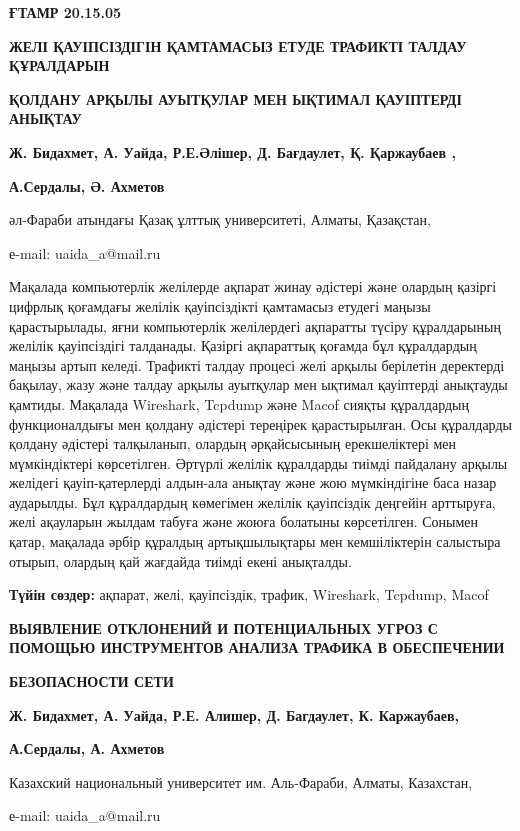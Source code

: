 \textbf{ҒТАМР 20.15.05}

\textbf{ЖЕЛІ ҚАУІПСІЗДІГІН ҚАМТАМАСЫЗ ЕТУДЕ ТРАФИКТІ ТАЛДАУ ҚҰРАЛДАРЫН}

\textbf{ҚОЛДАНУ АРҚЫЛЫ АУЫТҚУЛАР МЕН ЫҚТИМАЛ ҚАУІПТЕРДІ АНЫҚТАУ}

\textbf{Ж. Бидахмет, А. Уайда, Р.Е.Әлішер, Д. Бағдаулет, Қ. Қаржаубаев
,}

\textbf{А.Сердалы, Ә. Ахметов}

әл-Фараби атындағы Қазақ ұлттық университеті, Алматы, Қазақстан,

е-mail: uaida\_a@mail.ru

Мақалада компьютерлік желілерде ақпарат жинау әдістері және олардың
қазіргі цифрлық қоғамдағы желілік қауіпсіздікті қамтамасыз етудегі
маңызы қарастырылады, яғни компьютерлік желілердегі ақпаратты түсіру
құралдарының желілік қауіпсіздігі талданады. Қазіргі ақпараттық қоғамда
бұл құралдардың маңызы артып келеді. Трафикті талдау процесі желі арқылы
берілетін деректерді бақылау, жазу және талдау арқылы ауытқулар мен
ықтимал қауіптерді анықтауды қамтиды. Мақалада Wireshark, Tcpdump және
Macof сияқты құралдардың функционалдығы мен қолдану әдістері тереңірек
қарастырылған. Осы құралдарды қолдану әдістері талқыланып, олардың
әрқайсысының ерекшеліктері мен мүмкіндіктері көрсетілген. Әртүрлі
желілік құралдарды тиімді пайдалану арқылы желідегі қауіп-қатерлерді
алдын-ала анықтау және жою мүмкіндігіне баса назар аударылды. Бұл
құралдардың көмегімен желілік қауіпсіздік деңгейін арттыруға, желі
ақауларын жылдам табуға және жоюға болатыны көрсетілген. Сонымен қатар,
мақалада әрбір құралдың артықшылықтары мен кемшіліктерін салыстыра
отырып, олардың қай жағдайда тиімді екені анықталды.

\textbf{Түйін сөздер:} ақпарат, желі, қауіпсіздік, трафик, Wireshark,
Tcpdump, Macof

\textbf{ВЫЯВЛЕНИЕ ОТКЛОНЕНИЙ И ПОТЕНЦИАЛЬНЫХ УГРОЗ С ПОМОЩЬЮ
ИНСТРУМЕНТОВ АНАЛИЗА ТРАФИКА В ОБЕСПЕЧЕНИИ}

\textbf{БЕЗОПАСНОСТИ СЕТИ}

\textbf{Ж. Бидахмет, А. Уайда, Р.Е. Алишер, Д. Багдаулет, К.
Каржаубаев,}

\textbf{А.Сердалы, А. Ахметов}

Казахский национальный университет им. Аль-Фараби, Алматы, Казахстан,

е-mail: uaida\_a@mail.ru


